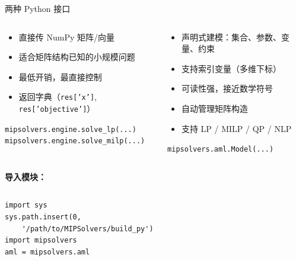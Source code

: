 \documentclass[10pt,aspectratio=169]{beamer}
\begin{document}
\begin{frame}[fragile]{两种 Python 接口}
  \begin{columns}[T]
    \begin{tcolorbox}[colback=orange!8,colframe=orange!70,title=底层 Engine 接口]
      \footnotesize
      \begin{itemize}
        \item 直接传 NumPy 矩阵/向量
        \item 适合矩阵结构已知的小规模问题
        \item 最低开销，最直接控制
        \item 返回字典（\texttt{res['x']}, \texttt{res['objective']}）
      \end{itemize}
      \vspace{4pt}
      \texttt{mipsolvers.engine.solve\_lp(...)}\\
      \texttt{mipsolvers.engine.solve\_milp(...)}
    \end{tcolorbox}

    \begin{tcolorbox}[colback=green!8,colframe=green!60!black,title=AML 代数建模接口]
      \footnotesize
      \begin{itemize}
        \item 声明式建模：集合、参数、变量、约束
        \item 支持索引变量（多维下标）
        \item 可读性强，接近数学符号
        \item 自动管理矩阵构造
        \item 支持 LP / MILP / QP / NLP
      \end{itemize}
      \vspace{4pt}
      \texttt{mipsolvers.aml.Model(...)}
    \end{tcolorbox}
  \end{columns}

  \vspace{10pt}
  \begin{center}
  \textbf{导入模块：}
  \end{center}
  \vspace{-4pt}
  \begin{columns}
    \begin{lstlisting}
import sys
sys.path.insert(0,
    '/path/to/MIPSolvers/build_py')
import mipsolvers
aml = mipsolvers.aml
    \end{lstlisting}
  \end{columns}
\end{frame}
\end{document}
